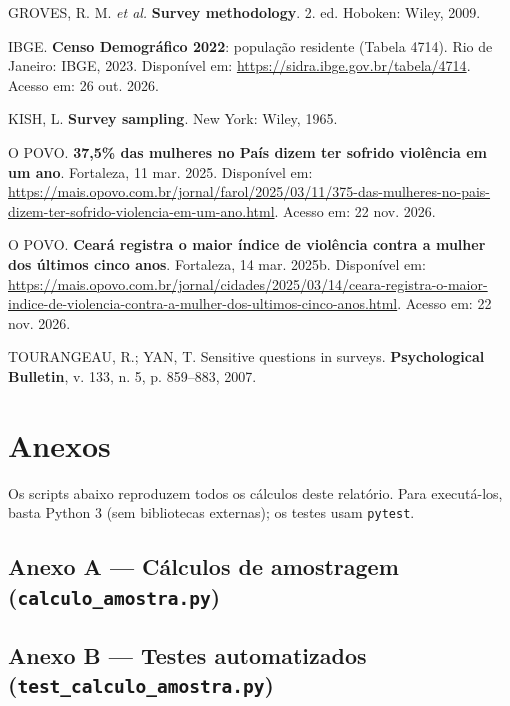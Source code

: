 \documentclass[12pt,a4paper]{article}
\begin{document}
\begin{description}
\item GROVES, R. M. \textit{et al.} \textbf{Survey methodology}. 2. ed. Hoboken: Wiley, 2009.

\item IBGE. \textbf{Censo Demográfico 2022}: população residente (Tabela 4714). Rio de Janeiro: IBGE, 2023. Disponível em: \url{https://sidra.ibge.gov.br/tabela/4714}. Acesso em: 26 out. 2026.

\item KISH, L. \textbf{Survey sampling}. New York: Wiley, 1965.

\item O POVO. \textbf{37,5\% das mulheres no País dizem ter sofrido violência em um ano}. Fortaleza, 11 mar. 2025. Disponível em: \url{https://mais.opovo.com.br/jornal/farol/2025/03/11/375-das-mulheres-no-pais-dizem-ter-sofrido-violencia-em-um-ano.html}. Acesso em: 22 nov. 2026.

\item O POVO. \textbf{Ceará registra o maior índice de violência contra a mulher dos últimos cinco anos}. Fortaleza, 14 mar. 2025b. Disponível em: \url{https://mais.opovo.com.br/jornal/cidades/2025/03/14/ceara-registra-o-maior-indice-de-violencia-contra-a-mulher-dos-ultimos-cinco-anos.html}. Acesso em: 22 nov. 2026.

\item TOURANGEAU, R.; YAN, T. Sensitive questions in surveys. \textbf{Psychological Bulletin}, v. 133, n. 5, p. 859--883, 2007.
\end{description}

\newpage

\section{Anexos}

Os scripts abaixo reproduzem todos os cálculos deste relatório. Para executá-los, basta Python 3 (sem bibliotecas externas); os testes usam \texttt{pytest}.

\subsection*{Anexo A --- Cálculos de amostragem (\texttt{calculo\_amostra.py})}


\subsection*{Anexo B --- Testes automatizados (\texttt{test\_calculo\_amostra.py})}

\end{document}
